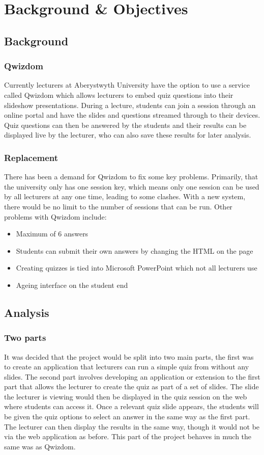 \chapter{Background \& Objectives}
\section{Background} 
\subsection{Qwizdom}
Currently lecturers at Aberystwyth University have the option to use a service called Qwizdom\cite{Qwizdom} which allows lecturers to embed quiz questions into their slideshow presentations. During a lecture, students can join a session through an online portal and have the slides and questions streamed through to their devices. Quiz questions can then be answered by the students and their results can be displayed live by the lecturer, who can also save these results for later analysis.

\subsection{Replacement}
There has been a demand for Qwizdom to fix some key problems. Primarily, that the university only has one session key, which means only one session can be used by all lecturers at any one time, leading to some clashes. With a new system, there would be no limit to the number of sessions that can be run. Other problems with Qwizdom include:
\begin{itemize}
	\item Maximum of 6 answers
	\item Students can submit their own answers by changing the HTML on the page
	\item Creating quizzes is tied into Microsoft PowerPoint which not all lecturers use
	\item Ageing interface on the student end
\end{itemize}

\section{Analysis}
\subsection{Two parts}
It was decided that the project would be split into two main parts, the first was to create an application that lecturers can run a simple quiz from without any slides. The second part involves developing an application or extension to the first part that allows the lecturer to create the quiz as part of a set of slides. The slide the lecturer is viewing would then be displayed in the quiz session on the web where students can access it. Once a relevant quiz slide appears, the students will be given the quiz options to select an answer in the same way as the first part. The lecturer can then display the results in the same way, though it would not be via the web application as before. This part of the project behaves in much the same was as Qwizdom.

